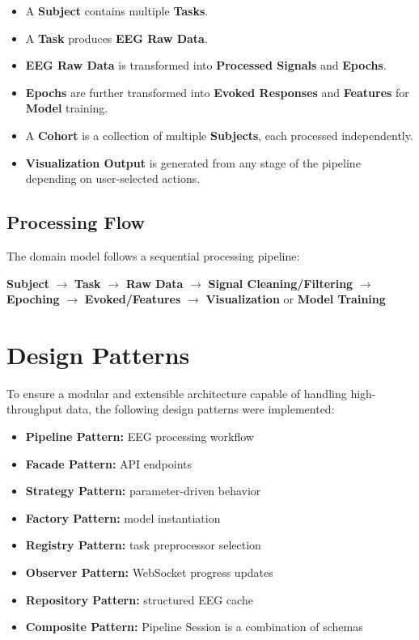 \begin{itemize}
    \item A \textbf{Subject} contains multiple \textbf{Tasks}.
    \item A \textbf{Task} produces \textbf{EEG Raw Data}.
    \item \textbf{EEG Raw Data} is transformed into \textbf{Processed Signals} and \textbf{Epochs}.
    \item \textbf{Epochs} are further transformed into \textbf{Evoked Responses} and \textbf{Features} for \textbf{Model} training.
    \item A \textbf{Cohort} is a collection of multiple \textbf{Subjects}, each processed independently.
    \item \textbf{Visualization Output} is generated from any stage of the pipeline depending on user-selected actions.
\end{itemize}

\subsection*{Processing Flow}
The domain model follows a sequential processing pipeline:

\begin{center}
\textbf{Subject} $\rightarrow$ \textbf{Task} $\rightarrow$ \textbf{Raw Data} $\rightarrow$ \textbf{Signal Cleaning/Filtering} $\rightarrow$ \textbf{Epoching} $\rightarrow$ \textbf{Evoked/Features} $\rightarrow$ \textbf{Visualization} or \textbf{Model Training}
\end{center}

\section{Design Patterns}
\label{sec:design-patterns}

To ensure a modular and extensible architecture capable of handling high-throughput data, the following design patterns were implemented:
\vspace{0.5em}

\begin{itemize}[leftmargin=*]
    \item \textbf{Pipeline Pattern:} EEG processing workflow
    \item \textbf{Facade Pattern:} API endpoints
    \item \textbf{Strategy Pattern:} parameter-driven behavior
    \item \textbf{Factory Pattern:} model instantiation
    \item \textbf{Registry Pattern:} task preprocessor selection
    \item \textbf{Observer Pattern:} WebSocket progress updates
    \item \textbf{Repository Pattern:} structured EEG cache
    \item \textbf{Composite Pattern:} Pipeline Session is a combination of schemas
\end{itemize}

